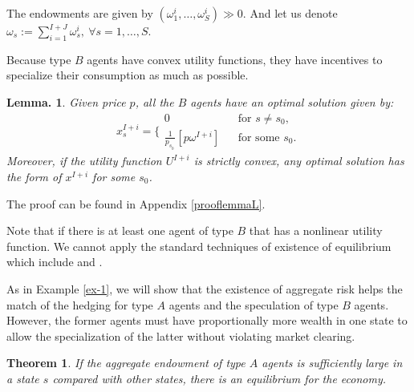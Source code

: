 \documentclass[pdftex]{article}
\numberwithin{equation}{section}
\theoremstyle{th}
\newtheorem{thm}{{Theorem}}%
\newtheorem{lemma}{{Lemma}.}%
\newtheorem{proof lemma}{{Proof Lemma}.}
\theoremstyle{definition}
\begin{document}
The endowments are given by $\left(\omega_1^i,\dots,\omega_S^i\right)\gg0$. And let us denote $\omega_s:=\sum_{i=1}^{I+J}\omega_s^i,\ \forall{s=1,\dots,S}$.

Because type $B$ agents have convex utility functions, they have incentives to specialize their consumption as much as possible.

\begin{lemma}\label{lemmaL}
Given price $p$, all the $B$ agents have an optimal solution given by:\[x^{I+i}_s=\Bigg\{\begin{array}{lcl} 0 & & \textrm{for }{s}\neq s_0, \\ \frac{1}{p_{s^{\,}_{0_{\,}}}}\left[p\omega^{I+i}\right] & & \textrm{for some }s_0.\end{array}\]
Moreover, if the utility function $U^{I+i}$ is strictly convex, any optimal solution has the form of $x^{I+i}$ for some $s_0$.
\end{lemma}
The proof can be found in Appendix \ref{prooflemmaL}.

Note that if there is at least one agent of type $B$ that has a nonlinear utility function. We cannot apply the standard techniques of existence of equilibrium which include \cite{Shafer} and \cite{HeYannelis}.


As in Example \ref{ex-1}, we will show that the existence of aggregate risk helps the match of the hedging for type $A$ agents and the speculation of type $B$ agents. However, the former agents must have proportionally more wealth in one state to allow the specialization of the latter without violating market clearing.

\begin{thm}
\label{theo1}
{If the aggregate endowment of type $A$ agents is sufficiently large in a state $s$ compared with other states, there is an equilibrium for the economy.}

\end{thm}
\end{document}
